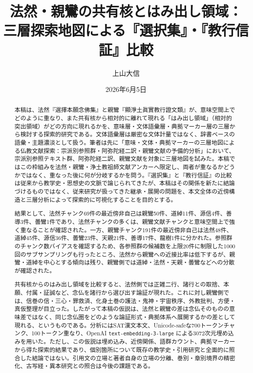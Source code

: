 \documentclass[uplatex,dvipdfmx,11pt,a4paper]{jsarticle}
\title{法然・親鸞の共有核とはみ出し領域：\\[0.35em]三層探索地図による『選択集』・『教行信証』比較}
\author{上山大信}
\date{2026年6月5日}
\begin{document}
\maketitle

\begin{abstract}
本稿は、法然『選擇本願念佛集』と親鸞『顯淨土眞實教行證文類』が、意味空間上でどのように重なり、また共有核から相対的に離れて現れる「はみ出し領域」（相対的突出領域）がどの方向に現れるかを、意味層・文体語彙層・典拠マーカー層の三層から検討する探索的研究である。文体語彙層は厳密な文体計量ではなく、辞書ベースの語彙・主題濃淡として扱う。筆者は先に「意味・文体・典拠マーカーの三層地図による仏教文献探索：宗派別参照群・阿弥陀経二訳・親鸞文献の予備的分析」において、宗派別参照テキスト群、阿弥陀経二訳、親鸞文献を対象に三層地図を試みた\cite{ueyama2026three-layer-map}。本稿ではこの枠組みを法然・親鸞・浄土教祖師文献アンカーへ限定し、両者が重なるかどうかではなく、重なった後に何が分岐するかを問う。『選択集』と『教行信証』の比較は従来から教学史・思想史の文脈で論じられてきたが、本稿はその関係を新たに結論づけるものではなく、従来研究が扱ってきた継承・展開の問題を、本文全体の近傍構造と三層分析によって探索的に可視化することを目的とする。

結果として、法然チャンク69件の最近傍非自己は親鸞50件、道綽11件、源信4件、善導3件、曇鸞1件であり、法然チャンクの多くは、親鸞文献チャンクと意味空間上で強く重なることが確認された。一方、親鸞チャンク191件の最近傍非自己は法然48件、道綽45件、源信36件、曇鸞23件、天親21件、善導17件、龍樹1件に分かれた。参照群のチャンク数バイアスを確認するため、各参照群の候補数を上限20件に制限した1000回のサブサンプリングも行ったところ、法然から親鸞への近接比率は低下するが、親鸞・道綽を中心とする傾向は残り、親鸞側では道綽・法然・天親・曇鸞などへの分散が確認された。

共有核からのはみ出し領域を比較すると、法然側では正雑二行、諸行との取捨、本願、付属・証誠など、念仏を諸行から選び出す論証が現れた。これに対し親鸞側では、信巻の信・三心・罪救済、化身土巻の護法・鬼神・宇宙秩序、外教批判、方便・真仮整理が目立った。したがって本稿の仮説は、法然と親鸞の差は念仏そのものの意味差ではなく、同じ念仏圏をどのような論証形式・典拠体系へ展開するかの差として現れる、というものである。分析にはSAT漢文本文、Unicode-safeな700トークンチャンク、100トークン重なり、OpenAI \texttt{text-embedding-3-large} による3072次元埋め込みを用いた。ただし、この仮説は埋め込み、近傍関係、語群カウント、典拠マーカーから得た探索的結果であり、個別箇所について既存の教学史・引用研究と全面的に照合した結論ではない。引用文の立場と著者自身の立場の分離、巻別・章別境界の精密化、古写経・異本研究との照合は今後の課題である。
\end{abstract}
\end{document}
